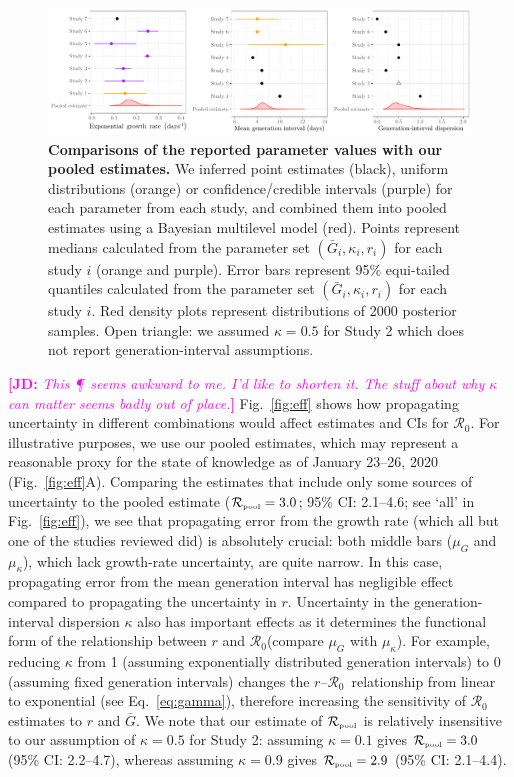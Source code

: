 \documentclass[12pt]{article}
\newcommand{\eref}[1]{Eq.~\ref{eq:#1}}
\newcommand{\fref}[1]{Fig.~\ref{fig:#1}}
\newcommand{\Ro}{\ensuremath{{\mathcal R}_{0}}\xspace}
\newcommand{\Rpool}{\ensuremath{{\mathcal R}_{\textrm{\tiny{pool}}}}\xspace}
\newcommand{\comment}[3]{\textcolor{#1}{\textbf{[#2: }\textsl{#3}\textbf{]}}}
\newcommand{\jd}[1]{\comment{magenta}{JD}{#1}}
\begin{document}
\begin{figure}[t]
\includegraphics[width=\textwidth]{compare_assumption.pdf}
\caption{
\textbf{Comparisons of the reported parameter values with our pooled estimates.}
We inferred point estimates (black), uniform distributions (orange) or confidence/credible intervals (purple) for each parameter from each study, and combined them into pooled estimates using a Bayesian multilevel model (red).
Points represent medians calculated from the parameter set $(\bar{G}_{i}, \kappa_{i}, r_{i})$ for each study $i$ (orange and purple).
Error bars represent 95\% equi-tailed quantiles calculated from the parameter set $(\bar{G}_{i}, \kappa_{i}, r_{i})$ for each study $i$.
Red density plots represent distributions of 2000 posterior samples.
Open triangle: we assumed $\kappa=0.5$ for Study 2 which does not report generation-interval assumptions.
}
\label{fig:assumption}
\end{figure}

\jd{This \P\ seems awkward to me. I'd like to shorten it. The stuff about why $\kappa$ can matter seems badly out of place.}
\fref{eff} shows how propagating uncertainty in different combinations would affect estimates and CIs for \Ro. 
For illustrative purposes, we use our pooled estimates, which may represent a reasonable proxy for the state of knowledge as of January 23--26, 2020 (\fref{eff}A).
Comparing the estimates that include only some sources of uncertainty to the pooled estimate ($\Rpool = 3.0$; 95\% CI: 2.1--4.6; see `all' in \fref{eff}), we see that propagating error from the growth rate (which all but one of the studies reviewed did) is absolutely crucial: both middle bars ($\mu_G$ and $\mu_\kappa$), which lack growth-rate uncertainty, are quite narrow.
In this case, propagating error from the mean generation interval has negligible effect compared to propagating the uncertainty in $r$.
Uncertainty in the generation-interval dispersion $\kappa$ also has important effects as it determines the functional form of the relationship between $r$ and \Ro (compare $\mu_G$ with $\mu_\kappa$).
For example, reducing $\kappa$ from 1 (assuming exponentially distributed generation intervals) to 0 (assuming fixed generation intervals) changes the $r$--\Ro\ relationship from linear to exponential (see \eref{gamma}), therefore increasing the sensitivity of \Ro estimates to $r$ and $\bar G$.
We note that our estimate of \Rpool is relatively insensitive to our assumption of $\kappa=0.5$ for Study 2: assuming $\kappa=0.1$ gives $\Rpool = 3.0$ (95\% CI: 2.2--4.7), whereas assuming $\kappa=0.9$ gives $\Rpool = 2.9$ (95\% CI: 2.1--4.4).
\end{document}
